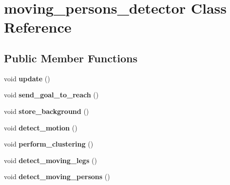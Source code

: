\hypertarget{classmoving__persons__detector}{}\section{moving\+\_\+persons\+\_\+detector Class Reference}
\label{classmoving__persons__detector}
\subsection*{Public Member Functions}
\begin{DoxyCompactItemize}
\item 
void {\bfseries update} ()\hypertarget{classmoving__persons__detector_a22fd235d29f4a41b4e7904b76738baed}{}\label{classmoving__persons__detector_a22fd235d29f4a41b4e7904b76738baed}

\item 
void {\bfseries send\+\_\+goal\+\_\+to\+\_\+reach} ()\hypertarget{classmoving__persons__detector_ac80c809c589313490eb280cbce223228}{}\label{classmoving__persons__detector_ac80c809c589313490eb280cbce223228}

\item 
void {\bfseries store\+\_\+background} ()\hypertarget{classmoving__persons__detector_ac0ecfeda0495b2ba7f7004851fd67e82}{}\label{classmoving__persons__detector_ac0ecfeda0495b2ba7f7004851fd67e82}

\item 
void {\bfseries detect\+\_\+motion} ()\hypertarget{classmoving__persons__detector_ab556a848049a07681112fc60aac58bda}{}\label{classmoving__persons__detector_ab556a848049a07681112fc60aac58bda}

\item 
void {\bfseries perform\+\_\+clustering} ()\hypertarget{classmoving__persons__detector_a5ecb03bfa3c5fffbdd16da4ed7a255d8}{}\label{classmoving__persons__detector_a5ecb03bfa3c5fffbdd16da4ed7a255d8}

\item 
void {\bfseries detect\+\_\+moving\+\_\+legs} ()\hypertarget{classmoving__persons__detector_a53e036c28def16757dac2850231ed614}{}\label{classmoving__persons__detector_a53e036c28def16757dac2850231ed614}

\item 
void {\bfseries detect\+\_\+moving\+\_\+persons} ()\hypertarget{classmoving__persons__detector_af7e1bb275af1ca1a6a062d1162d4100e}{}\label{classmoving__persons__detector_af7e1bb275af1ca1a6a062d1162d4100e}


\end{DoxyCompactItemize}
